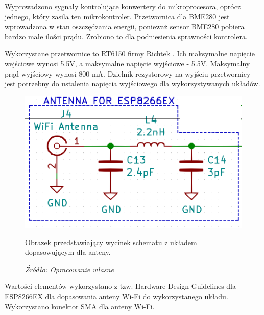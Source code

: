\documentclass[12pt,a4paper,oneside]{memoir}
\begin{document}
\par Wyprowadzono sygnały kontrolujące konwertery do mikroprocesora, oprócz jednego, który zasila ten mikrokontroler. Przetwornica dla BME280 jest wprowadzona w stan oszczędzania energii, ponieważ sensor BME280 pobiera bardzo małe ilości prądu. Zrobiono to dla podniesienia sprawności kontrolera. 
\par Wykorzystane przetwornice to RT6150 firmy Richtek \cite{rt6150}. Ich maksymalne napięcie wejściowe wynosi 5.5V, a maksymalne napięcie wyjściowe - 5.5V. Maksymalny prąd wyjściowy wynosi 800 mA. Dzielnik rezystorowy na wyjściu przetwornicy jest potrzebny do ustalenia napięcia wyjściowego dla wykorzystywanych układów.
\newpage
\begin{figure}[!h]
	\centering
	\includegraphics[scale=1.5]{images/sch/sch-06.png}
	{\tytulyrozdzialow \footnotesize \caption[Schemat - układ dopasowania] {Obrazek przedstawiający wycinek schematu z układem dopasowującym dla anteny.}}
	\caption*{\textit{Źródło: Opracowanie własne}}
\end{figure}
\par Wartości elementów wykorzystano z tzw. Hardware Design Guidelines dla ESP8266EX \cite{esp8266exhdg} dla dopasowania anteny Wi-Fi do wykorzystanego układu. Wykorzystano konektor SMA dla anteny Wi-Fi.
\end{document}
